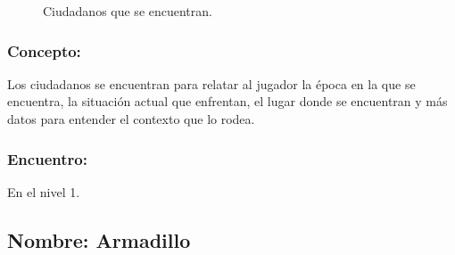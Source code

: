 \documentclass[11pt,letterpaper]{article}
\begin{document}
\begin{figure}
	\caption{Ciudadanos que se encuentran.}
	\label{fig:Ciudadanos}
\end{figure} 
\subsubsection{Concepto:}
Los ciudadanos se encuentran para relatar al jugador la época en la que se encuentra, la situación actual que enfrentan, el lugar donde se encuentran y más datos para entender el contexto que lo rodea.
\subsubsection{Encuentro:}
En el nivel 1.

\subsection{Nombre: Armadillo}  \label{per.armadillo} 
\end{document}
